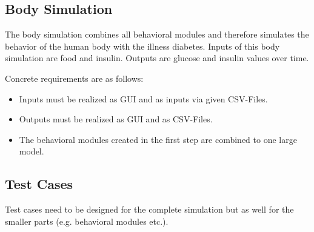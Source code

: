 \subsection{Body Simulation}
The body simulation combines all behavioral modules and therefore simulates the
behavior of the human body with the illness diabetes.
Inputs of this body simulation are food and insulin.
Outputs are glucose and insulin values over time.

Concrete requirements are as follows:
\begin{itemize}
  \item Inputs must be realized as GUI and as inputs via given CSV-Files.
  \item Outputs must be realized as GUI and as CSV-Files.
  \item The behavioral modules created in the first step are combined to one
  large model.
\end{itemize} 

\subsection{Test Cases}
Test cases need to be designed for the complete simulation but as well for the
smaller parts (e.g. behavioral modules etc.).

